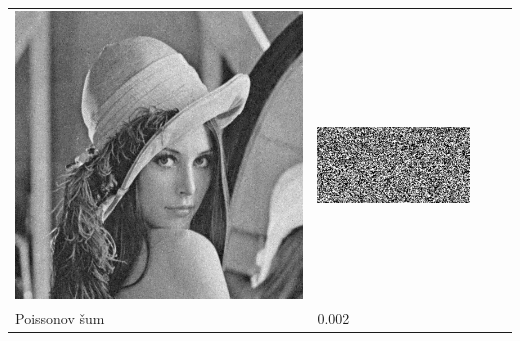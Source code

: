 \begin{table}[h]
\begin{tabular}{llcc}
\begin{minipage}[c]{.1\textwidth}
  \includegraphics[scale=0.1]{obrazky/LaplacianNoise}
\end{minipage} & 
\begin{minipage}[c]{.15\textwidth}
\ 
  \includegraphics[scale=0.25]{obrazky/LaplacianNoise-wm}
\end{minipage}  \\
Poissonov šum                          & 0.002 & 
\begin{minipage}[c]{.1\textwidth}
\ 

\end{minipage}
\end{tabular}
\end{table}
